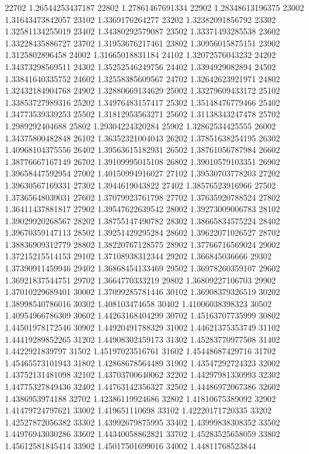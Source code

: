 {22702 1.26544253437187
22802 1.27861467691334
22902 1.28348613196375
23002 1.31643473842057
23102 1.3369176264277
23202 1.32382091856792
23302 1.32581134255019
23402 1.34380292579087
23502 1.33371493285538
23602 1.33228435886727
23702 1.31953676217461
23802 1.30956015875151
23902 1.3125802896458
24002 1.31665018831184
24102 1.32072576043232
24202 1.34373298569511
24302 1.35252546249756
24402 1.3394929082894
24502 1.33841640335752
24602 1.32558385609567
24702 1.32642623921971
24802 1.32432184904768
24902 1.32880669134629
25002 1.33279609433172
25102 1.33853727989316
25202 1.34976483157417
25302 1.35148476779466
25402 1.34773539339253
25502 1.31812953563271
25602 1.31138343247478
25702 1.2989292404688
25802 1.29304224320284
25902 1.32862534425555
26002 1.34375800482848
26102 1.36352321004043
26202 1.37851638254195
26302 1.40968104375556
26402 1.39563615182931
26502 1.38761056787984
26602 1.38776667167149
26702 1.39109995015108
26802 1.39010579103351
26902 1.39658447592954
27002 1.40150994916027
27102 1.39530703778203
27202 1.39630567169331
27302 1.3944619043822
27402 1.38576523916966
27502 1.37365648039031
27602 1.37079923761798
27702 1.37635920788524
27802 1.36411437881817
27902 1.39547622639542
28002 1.39273009006783
28102 1.39029920268567
28202 1.38755147490782
28302 1.38665834575224
28402 1.39670359147113
28502 1.39251429295284
28602 1.39622071026527
28702 1.38836909312779
28802 1.38220767128575
28902 1.37766716569024
29002 1.37215215514153
29102 1.37108938312344
29202 1.366845036666
29302 1.37390911459946
29402 1.36868454133469
29502 1.36978260359107
29602 1.36921837544751
29702 1.3664770333219
29802 1.36809227106703
29902 1.37010229689401
30002 1.37099285781446
30102 1.36908379326519
30202 1.38998540786016
30302 1.408103474658
30402 1.41006038398323
30502 1.40954966786309
30602 1.44263168404299
30702 1.45163707735999
30802 1.44501978172546
30902 1.44920491788329
31002 1.44621375353749
31102 1.44419289852265
31202 1.44908302459173
31302 1.45283770977508
31402 1.4422921839797
31502 1.45197023516761
31602 1.45448687429716
31702 1.45465573101943
31802 1.42868678564489
31902 1.43547292724323
32002 1.43752131481098
32102 1.43703700640062
32202 1.44297981330993
32302 1.44775327849436
32402 1.44763142356327
32502 1.44486972067386
32602 1.4386953974188
32702 1.42386119924686
32802 1.41810675389092
32902 1.41479724797621
33002 1.419651110698
33102 1.42220171720335
33202 1.42527872056382
33302 1.43992679875995
33402 1.43999838308352
33502 1.44976943030286
33602 1.44340058862821
33702 1.45283525658059
33802 1.45612581845414
33902 1.45017501699016
34002 1.44811768523844
}
